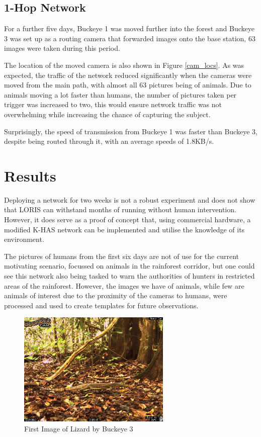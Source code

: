 		\subsection{1-Hop Network}
		For a further five days, Buckeye 1 was moved further into the forest and Buckeye 3 was set up as a routing camera that forwarded images onto the base station, 63 images were taken during this period.
		
		The location of the moved camera is also shown in Figure \ref{cam_locs}. As was expected, the traffic of the network reduced significantly when the cameras were moved from the main path, with almost all 63 pictures being of animals. Due to animals moving a lot faster than humans, the number of pictures taken per trigger was increased to two, this would ensure network traffic was not overwhelming while increasing the chance of capturing the subject.
		
		Surprisingly, the speed of transmission from Buckeye 1 was faster than Buckeye 3, despite being routed through it, with an average speeds of 1.8KB/s.				
		\section{Results}\label{loris:res}
		Deploying a network for two weeks is not a robust experiment and does not show that LORIS can withstand months of running without human intervention. However, it does serve as a proof of concept that, using commercial hardware, a modified K-HAS network can be implemented and utilise the knowledge of its environment.
		
		The pictures of humans from the first six days are not of use for the current motivating scenario, focussed on animals in the rainforest corridor, but one could see this network also being tasked to warn the authorities of hunters in restricted areas of the rainforest. However, the images we have of animals, while few are animals of interest due to the proximity of the cameras to humans, were processed and used to create templates for future observations. 
		
		    \begin{figure}[h]
		    \centering
			\includegraphics[width=0.65\textwidth]{Chap6/figures/buckeye_img}
		    \caption{First Image of Lizard by Buckeye 3}
		    \label{buckeye_img}
		    \end{figure}
		

